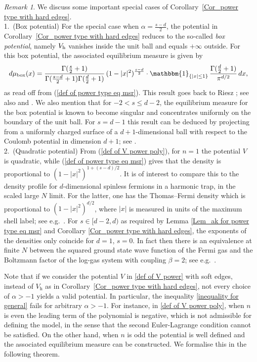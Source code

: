 \documentclass[10pt]{amsart}
\theoremstyle{plain}
\theoremstyle{remark}
\newtheorem{rem}{Remark}
\numberwithin{equation}{section}
\begin{document}
\begin{rem} We discuss some important special cases of Corollary~\ref{Cor_power type with hard edges}.
\smallskip 
\\ 
1.~(Box potential)
For the special case when $\alpha= \frac{s-d}{2}$, the potential in Corollary~\ref{Cor_power type with hard edges} reduces to the so-called \emph{box potential}, namely $V_{ \rm h }$ vanishes inside the unit ball and equals $+\infty$ outside. For this box potential, the associated equilibrium measure is given by 
\begin{equation}
d\mu_{ \rm box }(x) =  \frac{ \Gamma(\frac{s}{2}+1 )   }{ \Gamma(\frac{s-d}{2} +1)\Gamma(\frac{d}{2}+1) }  \, (1-|x|^2)^{ \frac{s-d}{2} }  \cdot  \mathbbm{1}_{ \{ |x| \le 1 \} } \, \frac{ \Gamma(\frac{d}{2}+1) }{\pi^{ d/2 }}\,dx,  
\end{equation}
as read off from (\ref{def of power type eq msr}).
This result goes back to Riesz \cite{Riesz38}; see also 
\cite[Theorem~1.1]{CSW22} and \cite{Be85}. 
We also mention that for $-2< s \le d-2$, the equilibrium measure for the box potential is known to become singular and concentrates uniformly on the boundary of the unit ball. For $s=d-1$ this result can be deduced by projecting from  a uniformly charged surface of a $d+1$-dimensional ball with respect to the Coulomb potential in dimension $d+1$; see  \cite[Proposition~4.2]{BF25a}.
\smallskip 
\\
2.~(Quadratic potential)
From (\ref{def of V power poly}), for $n=1$ the potential $V$ is quadratic, while (\ref{def of power type eq msr}) gives that the density is proportional to $(1 - |x|^2)^{1+(s-d)/2}$. It is of interest to compare this to the density profile for $d$-dimensional spinless fermions in a harmonic trap, in the scaled large $N$ limit. For the latter, one has the Thomas--Fermi density which is proportional to $(1 - |x|^2)^{d/2}$, where $|x|$ is measured in units of the maximum shell label; see e.g.~\cite{Ca06}. For $s \in [d-2,d)$ as required by Lemma \ref{Lem_ak for power type eq msr} and Corollary \ref{Cor_power type with hard edges}, the exponents of the densities only coincide for $d=1$, $s=0$. In fact then there is an equivalence at finite $N$ between the squared ground state wave function of the Fermi gas and the Boltzmann factor of the log-gas system with coupling $\beta = 2$; see e.g.~\cite{DLMS19}. 
 

\end{rem}
  
Note that if we consider the potential $V$ in \eqref{def of V power} with soft edges, instead of $V_{\mathrm{h}}$ as in Corollary~\ref{Cor_power type with hard edges}, not every choice of $\alpha > -1$ yields a valid potential. In particular, the inequality \eqref{inequality for general} fails for arbitrary $\alpha > -1$. For instance, in \eqref{def of V power poly}, when $n$ is even the leading term of the polynomial is negative, which is not admissible for defining the model, in the sense that the second Euler-Lagrange condition cannot be satisfied. On the other hand, when $n$ is odd the potential is well defined and the associated equilibrium measure can be constructed. We formalise this in the following theorem.
 
\end{document}
